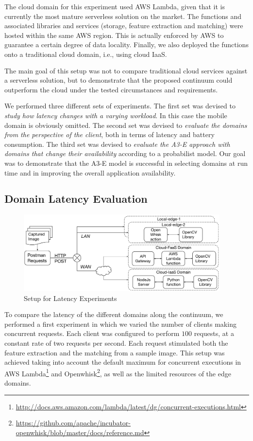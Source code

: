 The cloud domain for this experiment used AWS Lambda, given that it is currently the most mature serverless solution on the market. The functions and associated libraries and services (storage, feature extraction and matching) were hosted within the same AWS region. This is actually enforced by AWS to guarantee a certain degree of data locality. Finally, we also deployed the functions onto a traditional cloud domain, i.e., using cloud IaaS. 

The main goal of this setup was not to compare traditional cloud services against a serverless solution, but to demonstrate that the proposed continuum could outperform the cloud under the tested circumstances and requirements.

We performed three different sets of experiments. The first set was devised to \emph{study how latency changes with a varying workload}. In this case the mobile domain is obviously omitted. The second set was devised to \emph{evaluate the domains from the perspective of the client}, both in terms of latency and battery consumption. The third set was devised to \emph{evaluate the A3-E approach with domains that change their availability} according to a probabilist model. Our goal was to demonstrate that the A3-E model is successful in selecting domains at run time and in improving the overall application availability. 

\subsection{Domain Latency Evaluation} 


\begin{figure}[htb]
	\centering
	\includegraphics[width=0.95\textwidth]{figs/experimental-setup.pdf}
	\caption{Setup for Latency Experiments}
	\label{fig:exp-setup1}
\end{figure}

To compare the latency of the different domains along the continuum, we performed a first experiment in which we varied the number of clients making concurrent requests. Each client was configured to perform $100$ requests, at a constant rate of two requests per second. Each request stimulated both the feature extraction and the matching from a sample image. This setup was achieved taking into account the default maximum for concurrent executions in AWS Lambda\footnote{\url{http://docs.aws.amazon.com/lambda/latest/dg/concurrent-executions.html}} and Openwhisk\footnote{\url{https://github.com/apache/incubator-openwhisk/blob/master/docs/reference.md}}, as well as the limited resources of the edge domains. 

